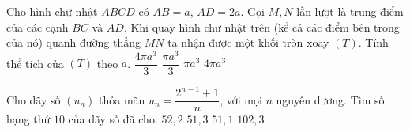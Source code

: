 \begin{ex}%
	Cho hình chữ nhật $ABCD$ có $AB=a$, $AD=2a$. Gọi $M,N$ lần lượt là trung điểm của các cạnh $BC$ và $AD$. Khi quay hình chữ nhật trên (kể cả các điểm bên trong của nó) quanh đường thẳng $MN$ ta nhận được một khối tròn xoay $(T)$. Tính thể tích của $(T)$ theo $a$.
	\choice
	{$\dfrac{4\pi a^3}{3}$}
	{$\dfrac{\pi a^3}{3}$}
	{\True $\pi a^3$}
	{$4\pi a^3$}
\end{ex}
\begin{ex}%
	Cho dãy số $(u_n)$ thỏa mãn $u_n= \dfrac{2^{n-1}+1}{n}$, với mọi $n$ nguyên dương. Tìm số hạng thứ $10$ của dãy số đã cho.
	\choice
	{$52{,} 2$}
	{\True $51{,}3$}
	{$51{,}1$}
	{$102{,}3$}
\end{ex}

